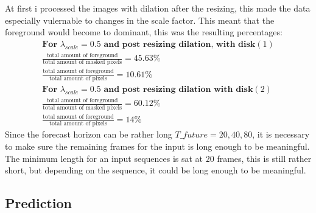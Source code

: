 \documentclass[a4paper,12pt]{article}
\begin{document}
At first i processed the images with dilation after the resizing, this made the data especially vulernable to changes in the scale factor. This meant that the foreground would become to dominant, this was the resulting percentages:
\begin{align*}
  \textbf{For $\lambda_{scale} = 0.5$ and post resizing dilation, with disk$(1)$}\\
  \frac{\text{total amount of foreground}}{\text{total amount of masked pixels}} = 45.63\%\\ 
  \frac{\text{total amount of foreground}}{\text{total amount of pixels}} = 10.61\%\\
  \textbf{For $\lambda_{scale} = 0.5$ and post resizing dilation with disk$(2)$}\\
  \frac{\text{total amount of foreground}}{\text{total amount of masked pixels}} = 60.12\%\\ 
  \frac{\text{total amount of foreground}}{\text{total amount of pixels}} = 14\%
\end{align*}
Since the forecast horizon can be rather long $T\_future = 20, 40, 80$, it is necessary to make sure the remaining frames for the input is long enough to be meaningful. The minimum length for an input sequences is sat at $20$ frames, this is still rather short, but depending on the sequence, it could be long enough to be meaningful.
\subsection{Prediction}
\end{document}
